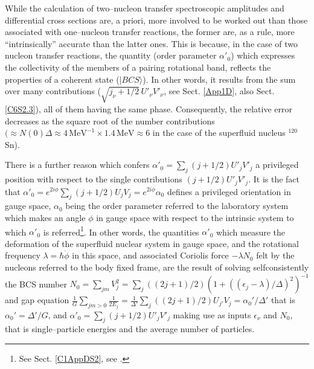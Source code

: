While the calculation of two--nucleon transfer spectroscopic amplitudes and differential cross sections are, a priori, more involved to be worked out than those associated with one--nucleon transfer reactions, the former are, as a rule, more ``intrinsically'' accurate than the latter ones. This is because, in the case of two nucleon transfer reactions, the quantity (order parameter $\alpha'_0$) which expresses the collectivity of the members of a pairing rotational band, reflects the properties of a coherent state ($|BCS\rangle$). In other words, it results from the sum over many contributions ($\sqrt{j_{\nu}+1/2}\,U'_\nu V'_\nu$, see Sect. \ref{App1D}, also Sect. \ref{C6S2.3}), all of them having the same phase. Consequently, the relative error decreases as the square root of the number contributions $(\approx N(0)\Delta\approx 4\,\text{MeV}^{-1}\times 1.4\,\text{MeV}\approx 6$ in the case of the superfluid nucleus $^{120}$Sn). 

There is a further reason which confers $\alpha'_0=\sum_j(j+1/2)U'_jV'_j$ a privileged position with respect to the single contributions $(j+1/2)U'_jV'_j$. It is the fact that $\alpha'_0=e^{2i\phi}\sum_j(j+1/2)U_jV_j=e^{2i\phi}\alpha_0$ defines a privileged orientation in gauge space, $\alpha_0$ being the order parameter referred to the laboratory system which makes an angle $\phi$ in gauge space with respect to the intrinsic system to which $\alpha'_0$ is referred\footnote{See Sect. \ref{C1AppDS2}, see \cite{Potel:13b}.}. In other words, the quantities $\alpha'_0$ which measure the deformation of the superfluid nuclear system in gauge space, and the rotational frequency $\lambda=\hbar\dot\phi$ in this space, and associated Coriolis force $-\lambda N_0$ felt by the nucleons referred to the body fixed frame, are the result of solving selfconsistently the BCS number 
$N_0=\sum_{jm}V_j^2=\sum_j((2j+1)/2)(1+((\epsilon_j-\lambda)/\Delta)^2)^{-1}$ and gap equation $\frac{1}{G}\sum_{jm>0}\frac{1}{2E_j}=\frac{1}{\Delta'}\sum_{j}((2j+1)/2)U_{j'}V_{j}=\alpha_0'/\Delta'$ that is $\alpha_0'=\Delta'/G$, and $\alpha'_0=\sum_j(j+1/2)U'_jV'_j$ making use as inputs $\epsilon_\nu$ and $ N_0$, that is single--particle energies and the average number of particles.


